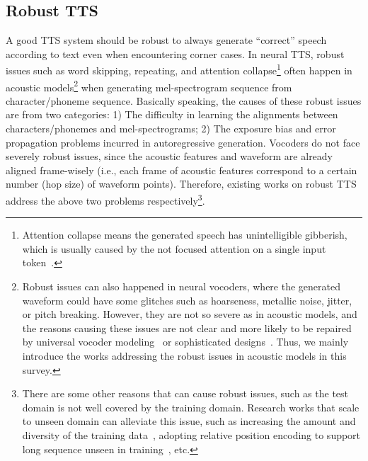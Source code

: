 \documentclass{article}
\begin{document}
\subsection{Robust TTS}
\label{sec_advance_robust}
A good TTS system should be robust to always generate ``correct'' speech according to text even when encountering corner cases. In neural TTS, robust issues such as word skipping, repeating, and attention collapse\footnote{Attention collapse means the generated speech has unintelligible gibberish, which is usually caused by the not focused attention on a single input token~\cite{he2019robust}.} often happen in acoustic models\footnote{Robust issues can also happened in neural vocoders, where the generated waveform could have some glitches such as hoarseness, metallic noise, jitter, or pitch breaking. However, they are not so severe as in acoustic models, and the reasons causing these issues are not clear and more likely to be repaired by universal vocoder modeling~\cite{lorenzo2019towards,paul2020speaker,jang2020universal,jiao2021universal} or sophisticated designs~\cite{chen2020hifisinger}. Thus, we mainly introduce the works addressing the robust issues in acoustic models in this survey.} when generating mel-spectrogram sequence from character/phoneme sequence. Basically speaking, the causes of these robust issues are from two categories: 1) The difficulty in learning the alignments between characters/phonemes and mel-spectrograms; 2) The exposure bias and error propagation problems incurred in autoregressive generation. Vocoders do not face severely robust issues, since the acoustic features and waveform are already aligned frame-wisely (i.e., each frame of acoustic features correspond to a certain number (hop size) of waveform points). Therefore, existing works on robust TTS address the above two problems respectively\footnote{There are some other reasons that can cause robust issues, such as the test domain is not well covered by the training domain. Research works that scale to unseen domain can alleviate this issue, such as increasing the amount and diversity of the training data~\cite{hwang2020tts}, adopting relative position encoding to support long sequence unseen in training~\cite{battenberg2020location,zeng2020prosody}, etc.}. 
 
\end{document}
